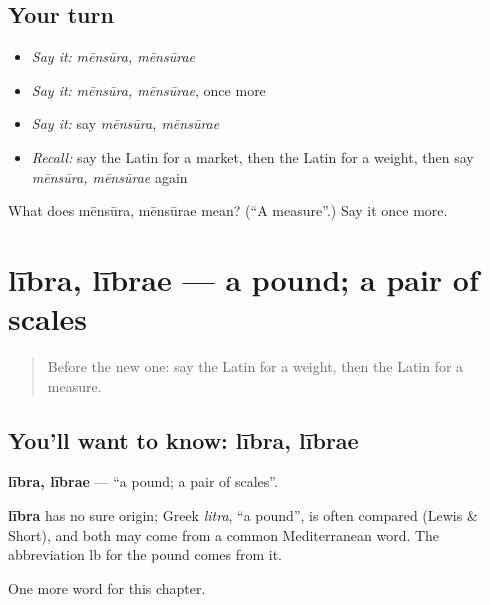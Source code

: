 \subsection*{Your turn}
\begin{itemize}
\raggedright
  \item \emph{Say it:} \emph{mēnsūra, mēnsūrae}
  \item \emph{Say it:} \emph{mēnsūra, mēnsūrae}, once more
  \item \emph{Say it:} say \emph{mēnsūra, mēnsūrae}
  \item \emph{Recall:} say the Latin for a market, then the Latin for a weight, then say \emph{mēnsūra, mēnsūrae} again
\end{itemize}

\begin{tcolorbox}[breakable,colback=teal!4,colframe=teal!35!black,title={Before you move on}]
What does mēnsūra, mēnsūrae mean? (\textquotedblleft{}A measure\textquotedblright{}.) Say it once more.
\end{tcolorbox}
\section[lībra, lībrae]{lībra, lībrae — a pound; a pair of scales}

\label{lesson:LA-C186-libra}



\begin{quote}
Before the new one: say the Latin for a weight, then the Latin for a measure.
\end{quote}

\subsection*{You'll want to know: lībra, lībrae}
\textbf{lībra, lībrae} — \textquotedblleft{}a pound; a pair of scales\textquotedblright{}.

\begin{cousinweb}
\textbf{lībra} has no sure origin; Greek \emph{litra}, \textquotedblleft{}a pound\textquotedblright{}, is often compared (Lewis \& Short), and both may come from a common Mediterranean word. The abbreviation lb for the pound comes from it.
\end{cousinweb}

\begin{grammarlens}[title={What you've built}]
One more word for this chapter.
\end{grammarlens}

